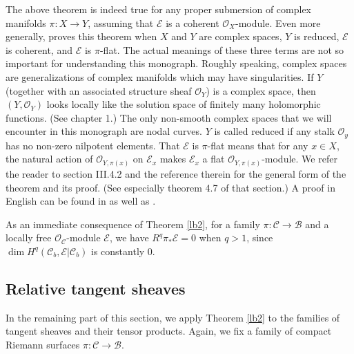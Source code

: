 \documentclass[12pt,a4paper,notitlepage]{report}
\theoremstyle{definition}
\theoremstyle{plain}
\newcommand{\mc}{\mathcal}
\newcommand{\scr}{\mathscr}
\numberwithin{equation}{section}
\begin{document}
The above theorem is indeed true for any proper submersion of complex manifolds $\pi:X\rightarrow Y$, assuming that $\scr E$ is a coherent $\scr O_X$-module. Even more generally, \cite{Gra60} proves this theorem when $X$ and $Y$ are complex spaces, $Y$ is reduced, $\scr E$ is coherent, and $\scr E$ is $\pi$-flat. The actual meanings of these three terms are not so important for understanding this monograph. Roughly speaking, complex spaces are generalizations of complex manifolds which may have singularities. If $Y$ (together with an associated structure sheaf $\scr O_Y$) is a complex space, then $(Y,\scr O_Y)$ looks locally like the solution space of finitely many holomorphic functions. (See  \cite{GR84} chapter 1.) The only non-smooth complex spaces that we will encounter in this monograph are nodal curves. $Y$ is called reduced if any stalk $\scr O_y$ has no non-zero nilpotent elements. That $\scr E$ is $\pi$-flat means that for any $x\in X$, the natural action of $\scr O_{Y,\pi(x)}$ on $\scr E_x$ makes $\scr E_x$ a flat $\scr O_{Y,\pi(x)}$-module. We refer the reader to \cite{GPR94} section III.4.2 and the reference therein for the general form of the theorem and its proof. (See especially theorem 4.7 of that section.) A proof in English can be found in \cite[Thm. III.4.12]{BS76} as well as \cite[Thm. 9.4.8]{EP96}.


As an immediate consequence of  Theorem \ref{lb2}, for a family $\pi:\mc C\rightarrow \mc B$ and a locally free $\scr O_{\mc C}$-module $\scr E$, we have $R^q\pi_*\scr E=0$ when $q>1$, since $\dim H^q(\mc C_b,\scr E|\mc C_b)$ is constantly $0$. 






\subsection*{Relative tangent sheaves}


In the remaining part of this section, we apply Theorem \ref{lb2} to the families of tangent sheaves and their tensor products. Again, we fix a family of compact Riemann surfaces $\pi:\mc C\rightarrow\mc B$.
\end{document}
